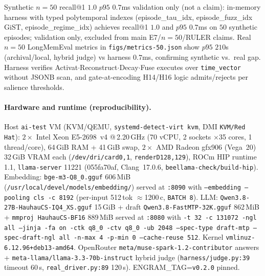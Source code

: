 Synthetic $n{=}50$ recall@1 $1.0$ $p95$ $0.7$ms validation only (not a claim): in-memory harness with typed polytemporal indexes (episode\_tau\_idx, episode\_fuzz\_idx GiST, episode\_regime\_idx) achieves recall@1 $1.0$ and $p95$ $0.7$ms on $50$ synthetic episodes; validation only, excluded from main E7/$n{=}50$/RULER claims. Real $n{=}50$ LongMemEval metrics in \texttt{figs/metrics-50.json} show $p95$ $210$s (archival/local, hybrid judge) vs harness $0.7$ms, confirming synthetic vs.\ real gap. Harness verifies Activat$\cdot$Reconstruct$\cdot$Decay$\cdot$Fuse executes over \texttt{time\_vector} without JSONB scan, and gate-at-encoding H14/H16 logic admits/rejects per salience thresholds.

\paragraph{Hardware and runtime (reproducibility).} Host \texttt{ai-test} VM (KVM/QEMU, \texttt{systemd-detect-virt kvm}, DMI \texttt{KVM/Red Hat}): $2\times$ Intel Xeon E5-2698~v4 @\,2.20\,GHz (70 vCPU, 2 sockets $\times$35 cores, 1 thread/core), 64\,GiB RAM + 41\,GiB swap, $2\times$ AMD Radeon gfx906 (Vega~20) 32\,GiB VRAM each (\texttt{/dev/dri/card0,1}, \texttt{renderD128,129}), ROCm HIP runtime 1.1, \texttt{llama-server} 11221 (055fa70af, Clang~17.0.6, \texttt{beellama-check/build-hip}). Embedding: \texttt{bge-m3-Q8\_0.gguf} 606\,MiB (\texttt{/usr/local/devel/models/embedding/}) served at \texttt{:8090} with \texttt{--embedding --pooling cls -c 8192} (per-input 512\,tok $\approx$1200\,c, \texttt{BATCH 8}). LLM: \texttt{Qwen3.8-27B-HauhauCS-IQ4\_XS.gguf} 15\,GiB + draft \texttt{Qwen3.8-FastMTP-32K.gguf} 862\,MiB + \texttt{mmproj HauhauCS-BF16} 889\,MiB served at \texttt{:8080} with \texttt{-t 32 -c 131072 -ngl all --jinja -fa on -ctk q8\_0 -ctv q8\_0 -ub 2048 --spec-type draft-mtp --spec-draft-ngl all -n-max 4 -p-min 0 --cache-reuse 512}. Kernel \texttt{vmlinuz-6.12.96+deb13-amd64}. OpenRouter \texttt{meta/muse-spark-1.2-contributor} answers + \texttt{meta-llama/llama-3.3-70b-instruct} hybrid judge (\texttt{harness/judge.py:39} timeout 60\,s, \texttt{real\_driver.py:89} 120\,s). ENGRAM\_TAG=\texttt{v0.2.0} pinned.

